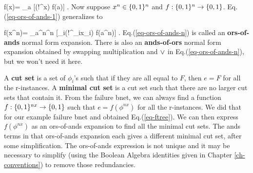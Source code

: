 \beq
f(x)= \V_{a\in\bool} [(!^{}x) f(a)]
\label{eq-ors-of-ands-1}
\;.
\eeq
Now suppose $x^n\in \{0,1\}^n$
and $f:\{0,1\}^n\rightarrow \{0,1\}$.
Eq.(\ref{eq-ors-of-ands-1})
generalizes to

\beq
f(x^n)= \V_{a^n\in\bool^n}
 [\prod_i(!^{_i}x_i) f(a^n)]
\label{eq-ors-of-ands-n}
\;.
\eeq
Eq.(\ref{eq-ors-of-ands-n})
is called an {\bf ors-of-ands} normal form 
expansion.
There is also an {\bf ands-of-ors} normal
form expansion 
obtained by swapping multiplication
and $\vee$
in Eq.(\ref{eq-ors-of-ands-n}), 
but we won't need it here.

A {\bf cut
set} is a set
of $\phi_i$'s such that
if they are all equal to $F$,
then $e=F$ for all the
r-instances.
A {\bf minimal cut set}
is a cut set such that there
are no larger cut sets that contain it.
From the failure bnet,
we can always find 
a function $f:\{0,1\}^{nx}\rightarrow\{0,1\}$
such that
$e=f(\phi^{nx})$
for all the r-instances.
We did that for our
example failure
bnet and obtained Eq.(\ref{eq-ftree}).
We can
then
express 
$f(\phi^{nx})$ as an ors-of-ands expansion
to find all the minimal cut sets.
The ands
terms in that ors-of-ands
expansion 
each gives
a different minimal cut set,
after some simplification.
The ors-of-ands
expression
is not unique
and it may be necessary to simplify 
(using the Boolean Algebra identities
given in Chapter \ref{ch-conventions})
to remove those redundancies.